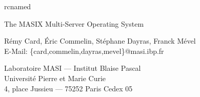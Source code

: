 %
%


	\raggedbottom

%
%

\newcommand {\code} [1]
	{\begin {quote}
		\tt
		\begin {tabbing}
			#1
		\end {tabbing}
	 \end {quote}
	}
\newcommand {\cindent} {\hspace* {10mm} \=}

%
%

\newcommand {\todo} [1]
	{\begin {center}
		\Large {A faire: #1}
	 \end {center}
	 \addcontentsline {toc} {subsubsection} {A faire: #1}
	}

%
%

\newcommand {\changementdebut}
	{\marginpar {\rule [2pt] {10mm} {1mm} $\bigtriangledown$}}
\newcommand {\changementfin}
	{\marginpar {\rule {10mm} {1mm} $\bigtriangleup$}}

%
%


	 {rcnamed}


\begin {center}
{\Large The MASIX Multi-Server Operating System}

R\'emy Card, \'Eric Commelin, St\'ephane Dayras, Franck M\'evel \\
E-Mail: \{card,commelin,dayras,mevel\}@masi.ibp.fr

Laboratoire MASI --- Institut Blaise Pascal \\
Universit\'e Pierre et Marie Curie \\
4, place Jussieu --- 75252 Paris Cedex 05 \\

\end {center}

